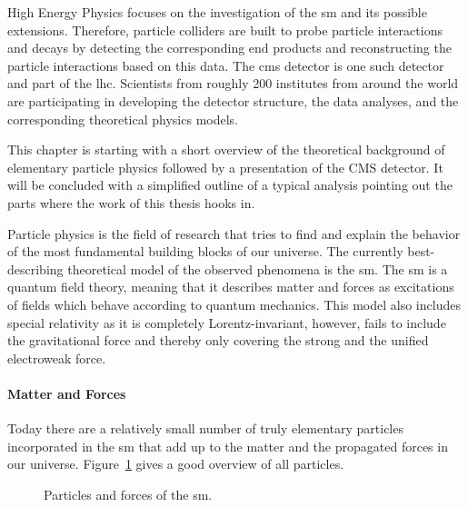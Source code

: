 
\label{ssec:cms}

High Energy Physics focuses on the investigation of the \gls{sm} and its possible extensions. Therefore, particle colliders are built to probe particle interactions and decays by detecting the corresponding end products and reconstructing the particle interactions based on this data. The \gls{cms} detector is one such detector and part of the \gls{lhc}. Scientists from roughly 200 institutes from around the world are participating in developing the detector structure, the data analyses, and the corresponding theoretical physics models.

This chapter is starting with a short overview of the theoretical background of elementary particle physics followed by a presentation of the CMS detector. It will be concluded with a simplified outline of a typical analysis pointing out the parts where the work of this thesis hooks in.

\label{sssec:sm}

Particle physics is the field of research that tries to find and explain the behavior of the most fundamental building blocks of our universe. The currently best-describing theoretical model of the observed phenomena is the \gls{sm}. The \gls{sm} is a quantum field theory, meaning that it describes matter and forces as excitations of fields which behave according to quantum mechanics. This model also includes special relativity as it is completely Lorentz-invariant, however, fails to include the gravitational force and thereby only covering the strong and the unified electroweak force.

\paragraph{Matter and Forces}

Today there are a relatively small number of truly elementary particles incorporated in the \gls{sm} that add up to the matter and the propagated forces in our universe. Figure~\ref{fig:particlezoo} gives a good overview of all particles.
\begin{figure}[ht!]
    \drawparticlezoo{}
    \caption{Particles and forces of the \gls{sm}.~\cite{like-eg3}}\label{fig:particlezoo}
\end{figure}

